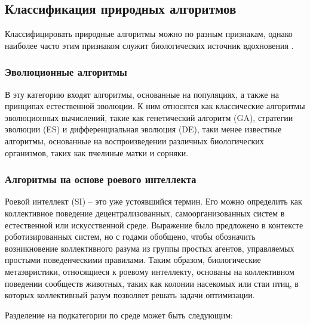 \subsection{Классификация природных алгоритмов}

Классифицировать природные алгоритмы можно по разным признакам, однако наиболее
часто этим признаком служит биологических источник вдохновения \cite{BioInspiredTaxonomy}.

\subsubsection{Эволюционные алгоритмы}

В эту категорию входят алгоритмы, основанные на популяциях, а также
на принципах естественной эволюции. К ним относятся как
классические алгоритмы эволюционных вычислений, такие как генетический
алгоритм (GA), стратегии эволюции (ES) и дифференциальная эволюция (DE),
таки менее известные алгоритмы, основанные на воспроизведении
различных биологических организмов, таких как пчелиные матки и сорняки.

\subsubsection{Алгоритмы на основе роевого интеллекта}

Роевой интеллект (SI) -- это уже устоявшийся термин. Его можно определить
как коллективное поведение децентрализованных, самоорганизованных систем в
естественной или искусственной среде. Выражение было предложено в контексте
роботизированных систем, но с годами обобщено, чтобы обозначить возникновение
коллективного разума из группы простых агентов, управляемых простыми поведенческими
правилами. Таким образом, биологические метаэвристики, относящиеся к роевому
интеллекту, основаны на коллективном поведении сообществ животных, таких как
колонии насекомых или стаи птиц, в которых коллективный разум позволяет решать
задачи оптимизации.

Разделение на подкатегории по среде может быть следующим:

